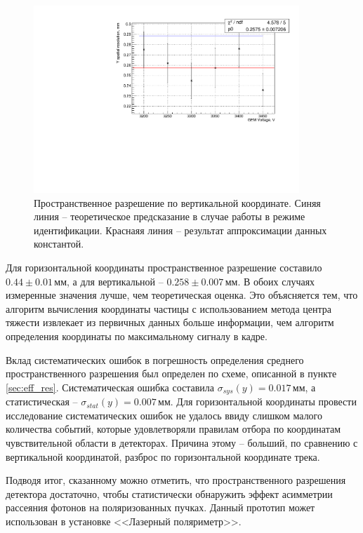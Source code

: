 \begin{figure}[h]
	\centering
	\includegraphics[width= 10cm]{img/y_sp_res.pdf}
	\caption{Пространственное разрешение по вертикальной координате. Синяя линия -- теоретическое предсказание в случае работы в режиме идентификации. Краснаяя линия -- результат аппроксимации данных константой.}
	\label{fig:y_sp_res}
\end{figure}
Для горизонтальной координаты пространственное разрешение составило $0.44 \pm 0.01$\,мм, а для вертикальной  -- $0.258 \pm 0.007$\,мм. В обоих случаях измеренные значения лучше, чем теоретическая оценка. Это объясняется тем, что алгоритм вычисления координаты частицы с использованием метода центра тяжести извлекает из первичных данных больше информации, чем алгоритм определения координаты по максимальному сигналу в кадре. 
\par Вклад систематических ошибок в погрешность определения среднего пространственного разрешения был определен по схеме, описанной в пункте \ref{sec:eff_res}. Систематическая ошибка составила $\sigma_{sys}(y) = 0.017$\,мм, а статистическая -- $\sigma_{stat}(y) = 0.007$\,мм. Для горизонтальной координаты провести исследование систематических ошибок не удалось ввиду слишком малого количества событий, которые удовлетворяли правилам отбора по координатам чувствительной области в детекторах. Причина этому -- больший, по сравнению с вертикальной координатой, разброс по горизонтальной координате трека.
\par Подводя итог, сказанному можно отметить, что пространственного разрешения детектора достаточно, чтобы статистически обнаружить эффект асимметрии рассеяния фотонов на поляризованных пучках. Данный прототип может использован в установке <<Лазерный поляриметр>>. 